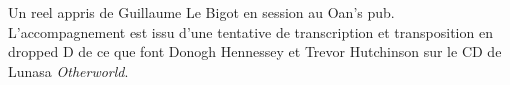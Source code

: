 Un reel appris de Guillaume Le Bigot en session au Oan's pub. L'accompagnement
est issu d'une tentative de transcription et transposition en dropped D de ce
que font Donogh Hennessey et Trevor Hutchinson sur le CD de Lunasa
\emph{Otherworld}.

\chords{
  \GMaj
  \Amin
  \Dva
  \CMaj
}

\chords{
  \AminpV
  \EminpV
  \DpX
  \CpVIII
}

\tune
